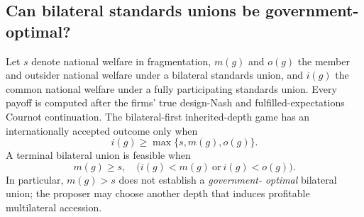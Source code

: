 \subsection{Can bilateral standards unions be government-optimal?}

Let $s$ denote national welfare in fragmentation,
$m(g)$ and $o(g)$ the member and outsider national welfare
under a bilateral standards union, and $i(g)$ the common
national welfare under a fully participating standards union.
Every payoff is computed after the firms' true design-Nash
and fulfilled-expectations Cournot continuation. The
bilateral-first inherited-depth game has an internationally
accepted outcome only when
\[
 i(g)\geq\max\{s,m(g),o(g)\}.
\]
A terminal bilateral union is feasible when
\[
 m(g)\geq s,\quad
 \bigl(i(g)<m(g)\ \text{or}\ i(g)<o(g)\bigr).
\]
In particular, $m(g)>s$ does not establish a \emph{government-
optimal} bilateral union; the proposer may choose another
depth that induces profitable multilateral accession.

